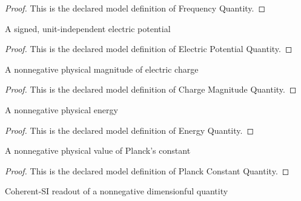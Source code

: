 \begin{proof}
  This is the declared model definition of Frequency Quantity.
\end{proof}
\begin{definition}
  \label{def:physics:phyx-mini-0516:phyxminiproblems-problemphyxmini0516-electricpotentialquantity}
  A signed, unit-independent electric potential
\end{definition}
\begin{proof}
  This is the declared model definition of Electric Potential Quantity.
\end{proof}
\begin{definition}
  \label{def:physics:phyx-mini-0516:phyxminiproblems-problemphyxmini0516-chargemagnitudequantity}
  A nonnegative physical magnitude of electric charge
\end{definition}
\begin{proof}
  This is the declared model definition of Charge Magnitude Quantity.
\end{proof}
\begin{definition}
  \label{def:physics:phyx-mini-0516:phyxminiproblems-problemphyxmini0516-energyquantity}
  A nonnegative physical energy
\end{definition}
\begin{proof}
  This is the declared model definition of Energy Quantity.
\end{proof}
\begin{definition}
  \label{def:physics:phyx-mini-0516:phyxminiproblems-problemphyxmini0516-planckconstantquantity}
  A nonnegative physical value of Planck's constant
\end{definition}
\begin{proof}
  This is the declared model definition of Planck Constant Quantity.
\end{proof}
\begin{definition}
  \label{def:physics:phyx-mini-0516:phyxminiproblems-problemphyxmini0516-nonnegativesireadout}
  Coherent-SI readout of a nonnegative dimensionful quantity
\end{definition}
